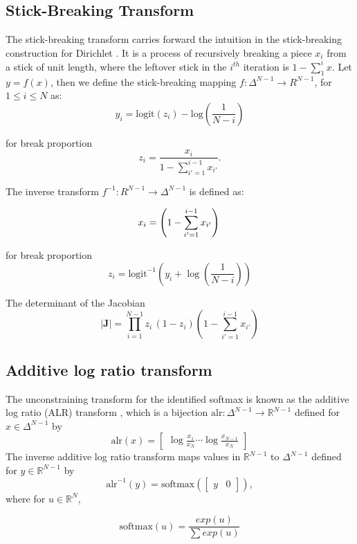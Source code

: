\documentclass[11pt]{article}
\newcommand{\abs}[1]{\left| #1 \right|}
\begin{document}
\subsection{Stick-Breaking Transform}

The stick-breaking transform carries forward the intuition in the stick-breaking construction for Dirichlet \cite{sethuraman1994constructive}. It is a process of recursively breaking a piece $x_i$ from a stick of unit length, where the leftover stick in the $i^{th}$ iteration is $ 1 - \sum_{1}^{i}x$. Let $y = f(x)$, then we define the stick-breaking mapping $ f \colon \Delta^{N-1} \to  R^{N-1}$, for $1 \leq i \leq N$ as:	
\[
y_i
= \mathrm{logit}(z_i) - \mbox{log}\left(\frac{1}{N-i}
   \right) 
   \]
  
for break proportion 
\[ 
 z_i = \frac{x_i}{1 - \sum_{i' = 1}^{i-1} x_{i'}}.
\]

The inverse transform $ f^{-1} \colon R^{N-1} \to \Delta^{N-1}$ is defined as:

\[
x_i = \left( 1 - \sum_{i'=1}^{i-1} x_{i'} \right)\\
\]

for break proportion \[z_i = \mathrm{logit}^{-1} \left( y_i  + \log \left( \frac{1}{N - i}
                                            \right)\right)
\]
                                            
The determinant of the Jacobian
\[
   \abs{\mathbf{J}} = \prod_{i=1}^{N-1}z_i\,(1 - z_i)\left(1 - \sum_{i'=1}^{i-1} x_{i'}\right)
\]
\subsection{Additive log ratio transform}
The unconstraining transform for the identified softmax is known as
the additive log ratio (ALR) transform
\cite{aitchison1982statistical}, which is a bijection
$\textrm{alr}:\Delta^{N-1} \rightarrow \mathbb{R}^{N-1}$ defined for
$x \in \Delta^{N-1}$ by
\[
  \textrm{alr}(x)
  = \begin{bmatrix}\displaystyle
    \log \frac{x_1}{x_N} \cdots \log \frac{x_{N-1}}{x_N}
  \end{bmatrix}
\]
The inverse additive log ratio transform maps values in
$\mathbb{R}^{N-1}$ to $\Delta^{N-1}$ defined for $y \in
\mathbb{R}^{N-1}$ by
\[
  \textrm{alr}^{-1}(y)
  = \textrm{softmax}(\begin{bmatrix} y &  0 \end{bmatrix}),
\]
where for $u \in \mathbb{R}^N$,

\[
  \textrm{softmax}(u) = \frac{exp(u)}{\sum exp(u)}
\]
\end{document}
